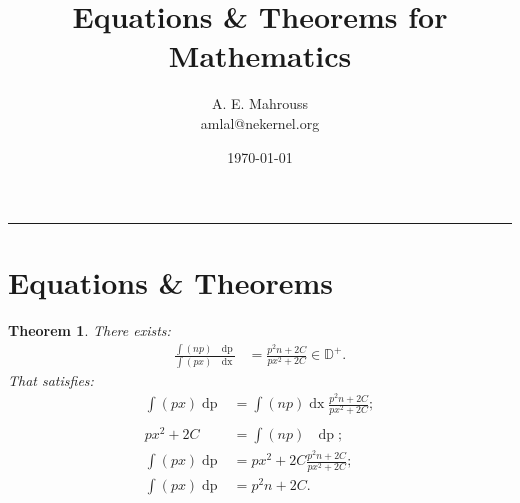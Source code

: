 \documentclass[10pt]{article}
\title{Equations \& Theorems for Mathematics}
\author{A. E. Mahrouss\\amlal@nekernel.org}
\date{\today}
\theoremstyle{plain}
\newtheorem{theorem}{Theorem}[section]
\theoremstyle{definition}
\theoremstyle{remark}
\begin{document}
\maketitle
\vspace{-0.5em}
\vspace{0.8em}
\rule{\linewidth}{0.4pt}
\vspace{1em}

\section{Equations \& Theorems}
\begin{theorem}
    There exists:
    \begin{align*}
        \frac{\int (np) \text{ } \operatorname{dp}}{\int (px) \text{ } \operatorname{dx}} &= \frac{p^2n+2C}{px^2+2C} \in \mathbb{D}^{+}.
    \end{align*}
    That satisfies:
    \begin{align*}
        \int (px) \operatorname{dp} &= \int (np) \operatorname{dx} \frac{p^2n+2C}{px^2+2C};\\\\
        px^2+2C &= \int (np) \text{ } \operatorname{dp};\\
        \int (px) \operatorname{dp} &= px^2+2C \frac{p^2n+2C}{px^2+2C};\\
        \int (px) \operatorname{dp} &= p^2n+2C.
    \end{align*}
\end{theorem}

\nocite{*}



\end{document}
